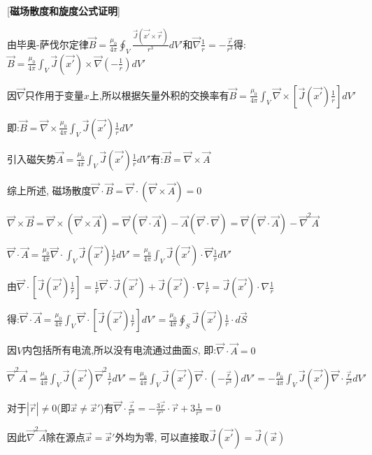[\textbf{磁场散度和旋度公式证明}] \par
\qquad 由毕奥-萨伐尔定律$\vec B=\frac{\mu_0}{4\pi}\oint_V\frac{\vec J(\vec{x'}\times \vec r)}{r^3}dV'$和$\vec \nabla\frac{1}{r}=-\frac{\vec r}{r^3}$得:$\vec B=\frac{\mu_0}{4\pi}\int_V\vec J(\vec{x'})\times \vec\nabla(-\frac{1}{r})dV'$\par
\qquad\quad 因$\vec\nabla$只作用于变量$x$上,所以根据矢量外积的交换率有$\vec B=\frac{\mu_0}{4\pi}\int_V\vec\nabla\times[\vec J(\vec{x'})\frac{1}{r}]dV'$\par
\qquad \qquad 即:$\vec B=\vec\nabla\times\frac{\mu_0}{4\pi}\int_V\vec J(\vec{x'})\frac{1}{r}dV'$\par
\qquad \quad 引入磁矢势$\vec A=\frac{\mu_0}{4\pi}\int_V\vec J(\vec{x'})\frac{1}{r}dV'$有:$\vec B=\vec \nabla\times\vec A$\par
\qquad 综上所述, 磁场散度$\vec\nabla\cdot\vec B=\vec\nabla\cdot(\vec \nabla\times\vec A)=0$\par
\qquad $\vec\nabla\times\vec B=\vec\nabla\times(\vec\nabla\times\vec A)=\vec\nabla(\vec\nabla\cdot\vec A)-\vec A(\vec\nabla\cdot\vec\nabla)=\vec\nabla(\vec\nabla\cdot\vec A)-\vec\nabla^2\vec A$\par
\qquad \quad$\vec\nabla\cdot\vec A=\frac{\mu_0}{4\pi}\vec\nabla\cdot\int_V\vec J(\vec{x'})\frac{1}{r}dV'=\frac{\mu_0}{4\pi}\int_V\vec J(\vec{x'})\cdot\vec\nabla\frac{1}{r}dV'$\par
\qquad\qquad 由$\vec\nabla\cdot[\vec J(\vec{x'})\frac{1}{r}]=\frac{1}{r}\vec\nabla\cdot\vec J(\vec{x'})+\vec J(\vec{x'})\cdot\nabla\frac{1}{r}=\vec J(\vec{x'})\cdot\nabla\frac{1}{r}$\par
\qquad\qquad \quad 得:$\vec\nabla\cdot\vec A=\frac{\mu_0}{4\pi}\int_V\vec\nabla\cdot[\vec J(\vec{x'})\frac{1}{r}]dV'=\frac{\mu_0}{4\pi}\oint_S\vec J(\vec{x'})\frac{1}{r}\cdot d\vec S$\par
\qquad \qquad 因$V$内包括所有电流,所以没有电流通过曲面$S$, 即:$\vec\nabla\cdot\vec A=0$\par
\qquad\quad $\vec\nabla^2\vec A=\frac{\mu_0}{4\pi}\int_V\vec J(\vec{x'})\vec\nabla^2\frac{1}{r}dV'=\frac{\mu_0}{4\pi}\int_V\vec J(\vec{x'})\vec\nabla\cdot(-\frac{\vec r}{r^3})dV'=-\frac{\mu_0}{4\pi}\int_V\vec J(\vec{x'})\vec\nabla\cdot\frac{\vec r}{r^3}dV'$\par
\qquad \qquad 对于$|\vec r|\ne 0$(即$\vec x\ne \vec x'$)有$\vec\nabla\cdot\frac{\vec r}{r^3}=-\frac{3\vec r}{r^5}\cdot\vec r+3\frac{1}{r^3}=0$\par
\qquad \qquad 因此$\vec\nabla^2\vec A$除在源点$\vec x=\vec x'$外均为零, 可以直接取$\vec J(\vec{x'})=\vec J(\vec{x})$\par

